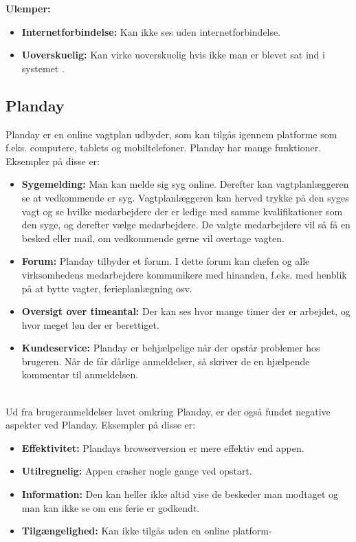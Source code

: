 \textbf{Ulemper: }
\begin{itemize}
\item {\textbf{Internetforbindelse:} Kan ikke ses uden internetforbindelse.}
\item {\textbf{Uoverskuelig:} Kan virke uoverskuelig hvis ikke man er blevet sat ind i systemet \citep{Tamigo, Trustpilot}.}
\end{itemize}



\subsection{Planday}
Planday er en online vagtplan udbyder, som kan tilgås igennem platforme som f.eks. computere, tablets og mobiltelefoner. Planday har mange funktioner. Eksempler på disse er:
\begin{itemize}
\item {\textbf{Sygemelding:} Man kan melde sig syg online. Derefter kan vagtplanlæggeren se at vedkommende er syg. Vagtplanlæggeren kan herved trykke på den syges vagt og se hvilke medarbejdere der er ledige med samme kvalifikationer som den syge, og derefter vælge medarbejdere. De valgte medarbejdere vil så få en besked eller mail, om vedkommende gerne vil overtage vagten.}
\item {\textbf{Forum:} Planday tilbyder et forum. I dette forum kan chefen og alle virksomhedens medarbejdere kommunikere med hinanden, f.eks. med henblik på at bytte vagter, ferieplanlægning osv.}
\item {\textbf{Oversigt over timeantal:} Der kan ses hvor mange timer der er arbejdet, og hvor meget løn der er berettiget.}
\item {\textbf{Kundeservice:} Planday er behjælpelige når der opstår problemer hos brugeren. Når de får dårlige anmeldelser, så skriver de en hjælpende kommentar til anmeldelsen.} 
\end{itemize} 
\citep{DanskInternetHandel, Simonsen2014, Planday}\\

\noindent Ud fra brugeranmeldelser lavet omkring Planday, er der også fundet negative aspekter ved Planday. Eksempler på disse er:
\begin{itemize}
\item {\textbf{Effektivitet:} Plandays browserversion er mere effektiv end appen.} 
\item {\textbf{Utilregnelig:} Appen crasher nogle gange ved opstart.}
\item {\textbf{Information:} Den kan heller ikke altid vise de beskeder man modtaget og man kan ikke se om ens ferie er godkendt.} 
\item {\textbf{Tilgængelighed:} Kan ikke tilgås uden en online platform-} \end{itemize}
\citep{Play}\\

